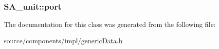 \hypertarget{classSA__unit_f2bd521c837d03abb97d9c8d0e037c0d}{
\subsubsection[{port}]{ {\bf SA\_\-unit::port}}}
\label{classSA__unit_f2bd521c837d03abb97d9c8d0e037c0d}




The documentation for this class was generated from the following file:\begin{CompactItemize}
\item 
source/components/impl/\hyperlink{impl_2genericData_8h}{genericData.h}\end{CompactItemize}
